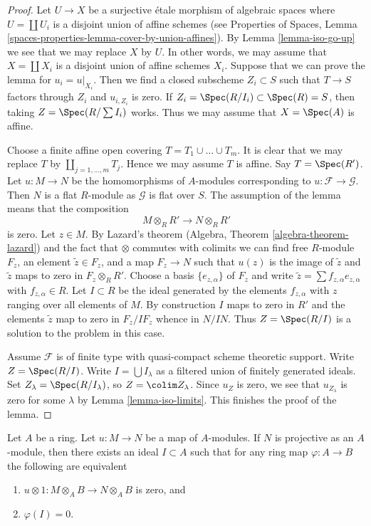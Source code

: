 \begin{proof}
Let $U \to X$ be a surjective \'etale morphism of algebraic spaces
where $U = \coprod U_i$ is a disjoint union of affine schemes (see
Properties of Spaces, Lemma
\ref{spaces-properties-lemma-cover-by-union-affines}).
By Lemma \ref{lemma-iso-go-up} we see that we may
replace $X$ by $U$. In other words, we may assume that $X = \coprod X_i$
is a disjoint union of affine schemes $X_i$. Suppose that we can prove
the lemma for $u_i = u|_{X_i}$. Then we find a closed subscheme
$Z_i \subset S$ such that $T \to S$ factors through $Z_i$ and
$u_{i, Z_i}$ is zero. If
$Z_i = \Spec(R/I_i) \subset \Spec(R) = S$, then taking
$Z = \Spec(R/\sum I_i)$ works. Thus we may assume that
$X = \Spec(A)$ is affine.

\medskip\noindent
Choose a finite affine open covering $T = T_1 \cup \ldots \cup T_m$.
It is clear that we may replace $T$ by $\coprod_{j = 1, \ldots, m} T_j$.
Hence we may assume $T$ is affine. Say $T = \Spec(R')$.
Let $u : M \to N$ be the homomorphisms of $A$-modules
corresponding to $u : \mathcal{F} \to \mathcal{G}$.
Then $N$ is a flat $R$-module as $\mathcal{G}$ is flat over $S$.
The assumption of the lemma means that the composition
$$
M \otimes_R R' \to N \otimes_R R'
$$
is zero. Let $z \in M$. By Lazard's theorem
(Algebra, Theorem \ref{algebra-theorem-lazard}) and the fact
that $\otimes$ commutes with colimits we can find free $R$-module
$F_z$, an element $\tilde z \in F_z$, and a map $F_z \to N$ such that
$u(z)$ is the image of $\tilde z$ and $\tilde z$ maps to zero in
$F_z \otimes_R R'$. Choose a basis $\{e_{z, \alpha}\}$ of $F_z$ and write
$\tilde z = \sum f_{z, \alpha} e_{z, \alpha}$ with $f_{z, \alpha} \in R$.
Let $I \subset R$ be the ideal generated by the elements $f_{z, \alpha}$
with $z$ ranging over all elements of $M$.
By construction $I$ maps to zero in $R'$ and the elements $\tilde z$
map to zero in $F_z/IF_z$ whence in $N/IN$. Thus $Z = \Spec(R/I)$
is a solution to the problem in this case.

\medskip\noindent
Assume $\mathcal{F}$ is of finite type with quasi-compact scheme
theoretic support. Write $Z = \Spec(R/I)$.
Write $I = \bigcup I_\lambda$ as a filtered union of finitely generated
ideals. Set $Z_\lambda = \Spec(R/I_\lambda)$, so $Z = \colim Z_\lambda$.
Since $u_Z$ is zero, we see that $u_{Z_\lambda}$ is zero
for some $\lambda$ by Lemma \ref{lemma-iso-limits}.
This finishes the proof of the lemma.
\end{proof}

\begin{lemma}
\label{lemma-F-zero-module-map}
Let $A$ be a ring. Let $u : M \to N$ be a map of $A$-modules.
If $N$ is projective as an $A$-module, then there exists an ideal
$I \subset A$ such that for any ring map $\varphi : A \to B$
the following are equivalent
\begin{enumerate}
\item $u \otimes 1 : M \otimes_A B \to N \otimes_A B$ is zero, and
\item $\varphi(I) = 0$.
\end{enumerate}
\end{lemma}

